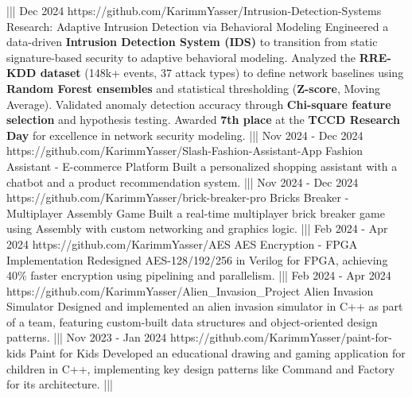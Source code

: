 {    |||
    {Dec 2024}%
    {https://github.com/KarimmYasser/Intrusion-Detection-Systems}%
    {Research: Adaptive Intrusion Detection via Behavioral Modeling}%
    {Engineered a data-driven \textbf{Intrusion Detection System (IDS)} to transition from static signature-based security to adaptive behavioral modeling. Analyzed the \textbf{RRE-KDD dataset} (148k+ events, 37 attack types) to define network baselines using \textbf{Random Forest ensembles} and statistical thresholding (\textbf{Z-score}, Moving Average). Validated anomaly detection accuracy through \textbf{Chi-square feature selection} and hypothesis testing. Awarded \textbf{7th place} at the \textbf{TCCD Research Day} for excellence in network security modeling.}%
    |||
    {Nov 2024 - Dec 2024}%
    {https://github.com/KarimmYasser/Slash-Fashion-Assistant-App}%
    {Fashion Assistant - E-commerce Platform}%
    {Built a personalized shopping assistant with a chatbot and a product recommendation system.}%
    |||
    {Nov 2024 - Dec 2024}%
    {https://github.com/KarimmYasser/brick-breaker-pro}%
    {Bricks Breaker - Multiplayer Assembly Game}%
    {Built a real-time multiplayer brick breaker game using Assembly with custom networking and graphics logic.}%
    |||
    {Feb 2024 - Apr 2024}%
    {https://github.com/KarimmYasser/AES}%
    {AES Encryption - FPGA Implementation}%
    {Redesigned AES-128/192/256 in Verilog for FPGA, achieving 40\% faster encryption using pipelining and parallelism.}%
    |||
    {Feb 2024 - Apr 2024}%
    {https://github.com/KarimmYasser/Alien_Invasion_Project}%
    {Alien Invasion Simulator}%
    {Designed and implemented an alien invasion simulator in C++ as part of a team, featuring custom-built data structures and object-oriented design patterns.}%
    |||
    {Nov 2023 - Jan 2024}%
    {https://github.com/KarimmYasser/paint-for-kids}%
    {Paint for Kids}%
    {Developed an educational drawing and gaming application for children in C++, implementing key design patterns like Command and Factory for its architecture.}%
    |||%
}


\newcommand{\programmingLanguages}{
Dart,
Kotlin,
Python,
C,
C++,
Rust,
Java,
TypeScript,
JavaScript,
SQL,
Assembly
}

\newcommand{\mobileDevelopment}{
Flutter (Mobile \& Desktop),
Android Development (Kotlin, Jetpack Compose, XML Views),
React Native (Expo)
}

